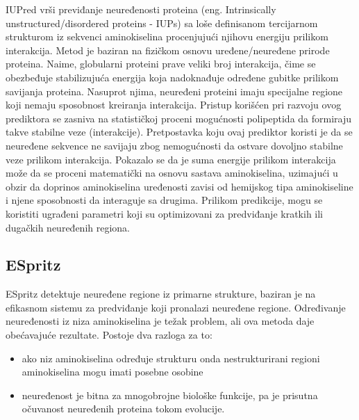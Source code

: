 IUPred vrši previđanje neuređenosti proteina (eng. Intrinsically unstructured/disordered proteins - IUPs) sa loše definisanom tercijarnom strukturom iz sekvenci aminokiselina procenjujući njihovu energiju prilikom interakcija.
Metod je baziran na fizičkom osnovu uređene/neuređene prirode proteina. Naime, globularni proteini prave veliki broj interakcija, čime se obezbeđuje stabilizujuća energija koja nadoknađuje određene gubitke prilikom savijanja proteina. Nasuprot njima, neuređeni proteini imaju specijalne regione koji nemaju sposobnost kreiranja interakcija. Pristup korišćen pri razvoju ovog prediktora se zasniva na statističkoj proceni mogućnosti polipeptida da formiraju takve stabilne veze (interakcije). Pretpostavka koju ovaj prediktor koristi je da se neuređene sekvence ne savijaju zbog nemogućnosti da ostvare dovoljno stabilne veze prilikom interakcija. Pokazalo se da je suma energije prilikom interakcija može da se proceni matematički na osnovu sastava aminokiselina, uzimajući u obzir da doprinos aminokiselina uređenosti zavisi od hemijskog tipa aminokiseline i njene sposobnosti da interaguje sa drugima. Prilikom predikcije, mogu se koristiti ugrađeni parametri koji su optimizovani za predviđanje kratkih ili dugačkih neuređenih regiona. ~\cite{IUPred, IUPred1, IUPred2, IUPred3}

 
\subsection{ESpritz}
ESpritz detektuje neuređene regione iz primarne strukture, baziran je na efikasnom sistemu za predviđanje koji pronalazi neuređene regione. Određivanje neuređenosti iz niza aminokiselina je težak problem, ali ova metoda daje obećavajuće rezultate. Postoje dva razloga za to:
\begin{itemize}
\item  ako niz aminokiselina određuje strukturu onda nestrukturirani regioni aminokiselina mogu imati posebne osobine 
\item neuređenost je bitna za mnogobrojne biološke funkcije, pa je prisutna očuvanost neuređenih proteina tokom evolucije. 
\end{itemize}

